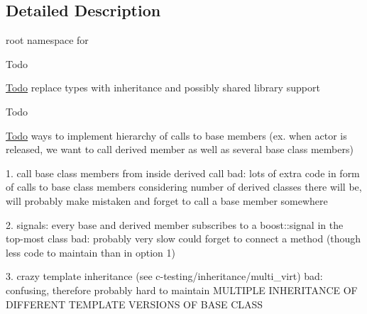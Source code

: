 \subsection{\-Detailed \-Description}
root namespace for  \begin{DoxyRefDesc}{\-Todo}
\item[\hyperlink{todo__todo000021}{\-Todo}]replace types with inheritance and possibly shared library support \end{DoxyRefDesc}


\begin{DoxyRefDesc}{\-Todo}
\item[\hyperlink{todo__todo000022}{\-Todo}]ways to implement hierarchy of calls to base members (ex. when actor is released, we want to call derived member as well as several base class members)\end{DoxyRefDesc}


1. call base class members from inside derived call bad\-: lots of extra code in form of calls to base class members considering number of derived classes there will be, will probably make mistaken and forget to call a base member somewhere

2. signals\-: every base and derived member subscribes to a boost\-::signal in the top-\/most class bad\-: probably very slow could forget to connect a method (though less code to maintain than in option 1)

3. crazy template inheritance (see c-\/testing/inheritance/multi\-\_\-virt) bad\-: confusing, therefore probably hard to maintain \-M\-U\-L\-T\-I\-P\-L\-E \-I\-N\-H\-E\-R\-I\-T\-A\-N\-C\-E \-O\-F \-D\-I\-F\-F\-E\-R\-E\-N\-T \-T\-E\-M\-P\-L\-A\-T\-E \-V\-E\-R\-S\-I\-O\-N\-S \-O\-F \-B\-A\-S\-E \-C\-L\-A\-S\-S 